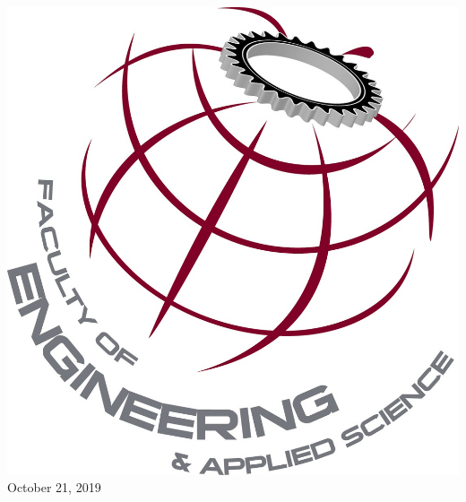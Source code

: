 \includegraphics[scale=0.4]{media/EngLogo.jpg}\\[1cm] %




{\large October 21, 2019}\\[2cm] %

\vfill %
